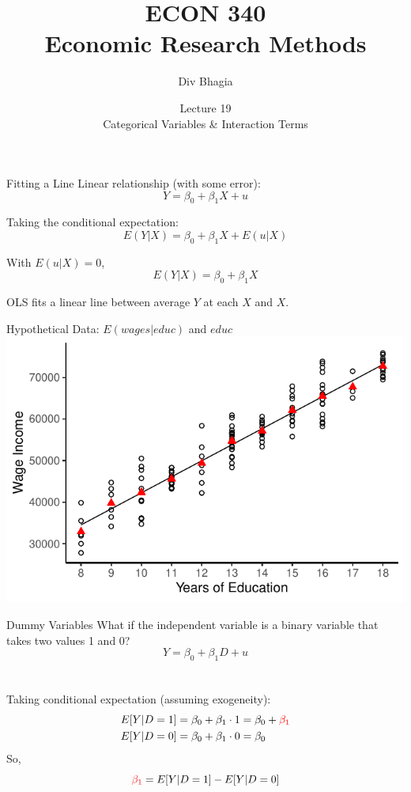 \documentclass{./../div_teaching_slides}
\begin{document}
\title{ECON 340 \\ Economic Research Methods}
\author{Div Bhagia}
\date{Lecture 19 \\ Categorical Variables \& Interaction Terms}

\begin{frame}
\maketitle
\end{frame}


\begin{frame}{Fitting a Line}
Linear relationship (with some error):
$$ Y = \beta_0 + \beta_1 X + u  $$

Taking the conditional expectation:
$$ E(Y | X) =  \beta_0 + \beta_1 X + E(u | X)  $$

With $E(u | X)=0$, 
$$ E(Y | X) =  \beta_0 + \beta_1 X   $$

OLS fits a linear line between average $Y$ at each $X$ and $X$. 
\end{frame}

\begin{frame}{Hypothetical Data: $E(wages|educ)$ and $educ$}
\centering
\includegraphics{./../../output/lrm_mean_fit.pdf}
\end{frame}

\begin{frame}{Dummy Variables}
What if the independent variable is a binary variable that takes two values 1 and 0?  
$$ Y = \beta_0 + \beta_1 D + u  $$ \\~\\
Taking conditional expectation (assuming exogeneity):
\begin{align*}
	E[Y | D=1] &= \beta_0 + \beta_1 \cdot 1  = \beta_0 + \textcolor{red}{\beta_1} \\
	E[Y | D=0] &= \beta_0 + \beta_1 \cdot 0 = \beta_0 
\end{align*}
So, $$\textcolor{red}{\beta_1} = E[Y | D=1]-E[Y | D=0] $$  
\end{frame}
\end{document}

